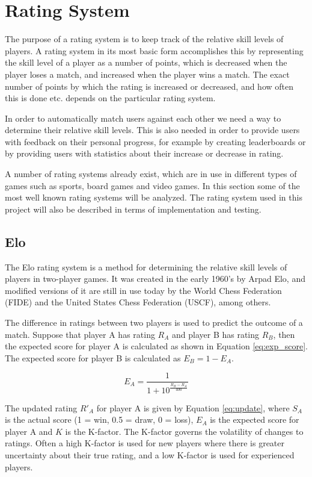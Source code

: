 \section{Rating System}
The purpose of a rating system is to keep track of the relative skill levels of players.
A rating system in its most basic form accomplishes this by representing the skill level of a player as a number of points, which is decreased when the player loses a match, and increased when the player wins a match.
The exact number of points by which the rating is increased or decreased, and how often this is done etc. depends on the particular rating system.

In order to automatically match users against each other we need a way to determine their relative skill levels.
This is also needed in order to provide users with feedback on their personal progress, for example by creating leaderboards or by providing users with statistics about their increase or decrease in rating.

A number of rating systems already exist, which are in use in different types of games such as sports, board games and video games.
In this section some of the most well known rating systems will be analyzed.
The rating system used in this project will also be described in terms of implementation and testing.

\subsection{Elo}
\label{sec:elo}
The Elo rating system is a method for determining the relative skill levels of players in two-player games.
It was created in the early 1960's by Arpad Elo, and modified versions of it are still in use today by the World Chess Federation (FIDE) and the United States Chess Federation (USCF), among others.

The difference in ratings between two players is used to predict the outcome of a match.
Suppose that player A has rating $R_A$ and player B has rating $R_B$, then the expected score for player A is calculated as shown in Equation \ref{eq:exp_score}.
The expected score for player B is calculated as $E_B = 1 - E_A$.

\begin{equation} \label{eq:exp_score}
E_A = \frac{1}{1 + 10^\frac{R_B - R_A}{400}}
\end{equation}

The updated rating $R'_A$ for player A is given by Equation \ref{eq:update}, where $S_A$ is the actual score (1 = win, 0.5 = draw, 0 = loss), $E_A$ is the expected score for player A and $K$ is the K-factor.
The K-factor governs the volatility of changes to ratings.
Often a high K-factor is used for new players where there is greater uncertainty about their true rating, and a low K-factor is used for experienced players.

